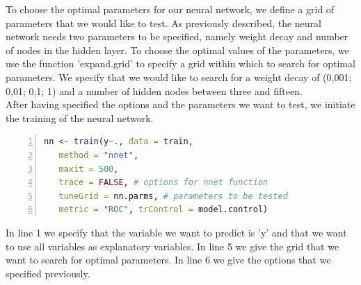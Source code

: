    To choose the optimal parameters for our neural network, we define a grid of parameters that we would like to test. As previously described, the neural network needs two parameters to be specified, namely weight decay and number of nodes in the hidden layer. To choose the optimal values of the parameters, we use the function 'expand.grid' to specify a grid within which to search for optimal parameters. We specify that we would like to search for a weight decay of (0,001; 0,01; 0,1; 1) and a number of hidden nodes between three and fifteen. \\
   [\baselineskip]\indent After having specified the options and the parameters we want to test, we initiate the training of the neural network.
    \begin{lstlisting}[language=R,numbers=left, numberstyle=\normalsize]
   nn <- train(y~., data = train,  
   method = "nnet", 
   maxit = 500, 
   trace = FALSE, # options for nnet function
   tuneGrid = nn.parms, # parameters to be tested
   metric = "ROC", trControl = model.control)
   \end{lstlisting}
   In line 1 we specify that the variable we want to predict is 'y' and that we want to use all variables as explanatory variables. In line 5 we give the grid that we want to search for optimal parameters. In line 6 we give the options that we specified previously.
   \\
   
   
